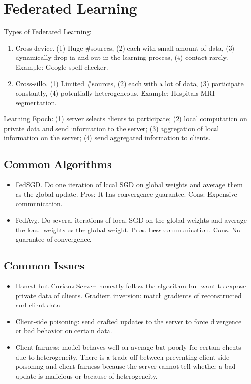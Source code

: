 \section{Federated Learning}

Types of Federated Learning:
\begin{enumerate}
    \item Cross-device. (1) Huge \#sources, (2) each with small amount of data, (3) dynamically drop in and out in the learning process, (4) contact rarely. Example: Google spell checker.
    \item Cross-sillo. (1) Limited \#sources, (2) each with a lot of data, (3) participate constantly, (4) potentially heterogeneous. Example: Hospitals MRI segmentation.
\end{enumerate}

Learning Epoch: (1) server selects clients to participate; (2) local computation on private data and send information to the server; (3) aggregation of local information on the server; (4) send aggregated information to clients.

\subsection*{Common Algorithms}
\begin{itemize}
    \item FedSGD. Do one iteration of local SGD on global weights and average them as the global update. Pros: It has convergence guarantee. Cons: Expensive communication.
    \item FedAvg. Do several iterations of local SGD on the global weights and average the local weights as the global weight. Pros: Less communication. Cons: No guarantee of convergence.
\end{itemize}

\subsection*{Common Issues}
\begin{itemize}
    \item Honest-but-Curious Server: honestly follow the algorithm but want to expose private data of clients. Gradient inversion: match gradients of reconstructed and client data.
    \item Client-side poisoning: send crafted updates to the server to force divergence or bad behavior on certain data. 
    \item Client fairness: model behaves well on average but poorly for certain clients due to heterogeneity. There is a trade-off between preventing client-side poisoning and client fairness because the server cannot tell whether a bad update is malicious or because of heterogeneity.
\end{itemize}

